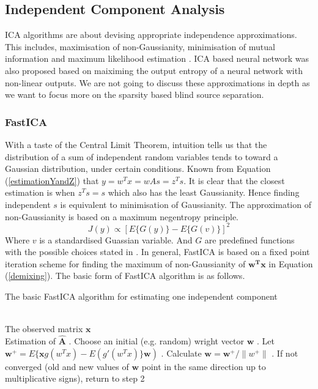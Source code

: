 \subsection{Independent Component Analysis}
ICA algorithms are about devising appropriate independence approximations. This includes, maximisation of non-Gaussianity, minimisation of mutual information and maximum likelihood estimation \cite{HYVARINEN2000411}. ICA based neural network \cite{Bell1995AnIA} was also proposed based on maiximing the output entropy of a neural network with non-linear outputs. We are not going to discuss these approximations in depth as we want to focus more on the sparsity based blind source separation.\\


\subsubsection{FastICA}
With a taste of the Central Limit Theorem, intuition tells us that the distribution of a sum of independent random variables tends to toward a Gaussian distribution, under certain conditions. Known from Equation (\ref{estimationYandZ}) that $y = w^T x = w A s = z^T s$. It is clear that the closest estimation is when $z^Ts = s$ which also has the least Gaussianity. Hence finding independent $s$ is equivalent to minimisation of Gaussianity. The approximation of non-Gaussianity is based on a maximum negentropy principle.
\begin{equation}
    J(y) \propto [E\{G(y)\} - E\{G(v)\}]^2
\end{equation}
Where $v$ is a standardised Guassian variable. And $G$ are predefined functions with the possible choices stated in \cite{HYVARINEN2000411}. In general, FastICA is based on a fixed point iteration scheme for finding the maximum of non-Gaussianity of $\mathbf{w^T x}$ in Equation (\ref{demixing}). The basic form of FastICA algorithm is as follows.

\begin{algorithm}[!htbp] 
\caption{ The basic FastICA algorithm for estimating one independent component}
\label{alg:Framwork} 
\begin{algorithmic}
\REQUIRE ~~\\%
The observed matrix $\mathbf{x}$
\ENSURE ~~\\ %
Estimation of $\hat{\mathbf{A}}$
. Choose an initial (e.g. random) wright vector $\mathbf{w}$
. Let $\mathbf{w}^+ = E\{\mathbf{x}g(w^T x) - E(g'(w^Tx)\}\mathbf{w})$
. Calculate $\mathbf{w} = \mathbf{w}^{+}/\lVert w^{+}\rVert$
. If not converged (old and new values of $\mathbf{w}$ point in the same direction up to multiplicative signs), return to step 2
\end{algorithmic}
\end{algorithm}

